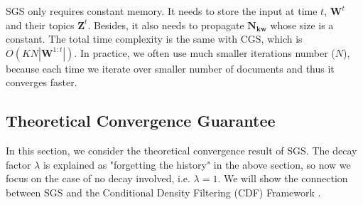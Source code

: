 \documentclass{article} %
\begin{document}
%

SGS only requires constant memory. It needs to store the input at time $t$, $\bm{W}^t$ and their topics $\bm{Z}^t$. Besides, it also needs to propagate $\bm{N_{kw}}$ whose size is a constant. The total time complexity is the same with CGS, which is $O(KN|\bm{W}^{1:t}|)$. In practice, we often use much smaller iterations number ($N$), because each time we iterate over smaller number of documents and thus it converges faster.


\subsection{Theoretical Convergence Guarantee}
In this section, we consider the theoretical convergence result of SGS. The decay factor $\lambda$ is explained as "forgetting the history" in the above section, so now we focus on the case of no decay involved, i.e. $\lambda=1$. We will show the connection between SGS and the Conditional Density Filtering (CDF) Framework \cite{guhaniyogi2014bayesian}.
\end{document}
